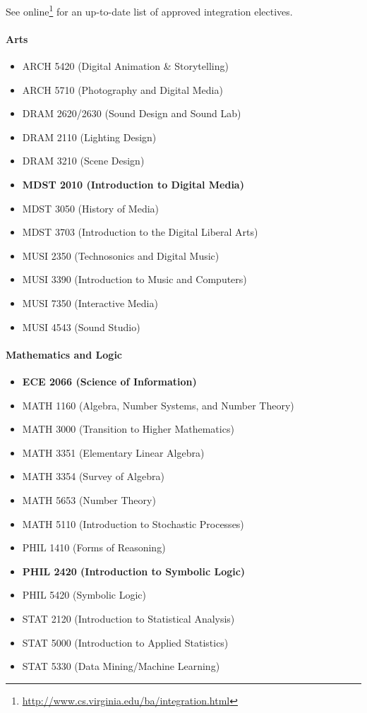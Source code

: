 \documentclass[10pt,letter]{book}
\newenvironment{itemlist}{
\begin{itemize}
\setlength{\itemsep}{0pt}
\setlength{\parskip}{0pt}}
{\end{itemize}}
\newcommand{\myurl}[1]{\footnote{\scriptsize\url{#1}}}
\begin{document}
See online\myurl{http://www.cs.virginia.edu/ba/integration.html}
for an up-to-date list of approved integration electives. 

\paragraph{Arts}
\begin{itemlist}
\item ARCH 5420 (Digital Animation \& Storytelling)
\item ARCH 5710 (Photography and Digital Media)
\item DRAM 2620/2630 (Sound Design and Sound Lab)
\item DRAM 2110 (Lighting Design)
\item DRAM 3210 (Scene Design)
\item {\bf MDST 2010 (Introduction to Digital Media)}
\item MDST 3050 (History of Media)
\item MDST 3703 (Introduction to the Digital Liberal Arts)
\item MUSI 2350 (Technosonics and Digital Music)
\item MUSI 3390 (Introduction to Music and Computers)
\item MUSI 7350 (Interactive Media)
\item MUSI 4543 (Sound Studio)
\end{itemlist}

\paragraph{Mathematics and Logic}
\begin{itemlist}
\item {\bf ECE 2066 (Science of Information)}
\item MATH 1160 (Algebra, Number Systems, and Number Theory)
\item MATH 3000 (Transition to Higher Mathematics)
\item MATH 3351 (Elementary Linear Algebra)
\item MATH 3354 (Survey of Algebra)
\item MATH 5653 (Number Theory)
\item MATH 5110 (Introduction to Stochastic Processes)
\item PHIL 1410 (Forms of Reasoning)
\item {\bf PHIL 2420 (Introduction to Symbolic Logic)}
\item PHIL 5420 (Symbolic Logic)
\item STAT 2120 (Introduction to Statistical Analysis)
\item STAT 5000 (Introduction to Applied Statistics)
\item STAT 5330 (Data Mining/Machine Learning)
\end{itemlist}
\end{document}
